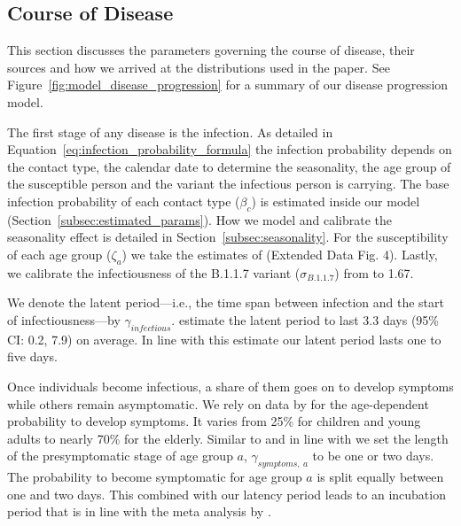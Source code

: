 \subsection{Course of Disease}
\label{sub:data_course_of_disease}

This section discusses the parameters governing the course of disease, their sources and
how we arrived at the distributions used in the paper.
See Figure~\ref{fig:model_disease_progression} for a summary of our
disease progression model.

The first stage of any disease is the infection. As detailed in
Equation~\ref{eq:infection_probability_formula} the infection
probability depends on the contact type, the calendar date to determine the seasonality,
the age group of the susceptible person and the variant the infectious person is
carrying.
%
The base infection probability of each contact type ($\beta_c$) is estimated inside our
model (Section~\ref{subsec:estimated_params}). How we model and calibrate the seasonality
effect is detailed in Section~\ref{subsec:seasonality}. For the susceptibility of each
age group ($\zeta_a$) we take the estimates of \citet{Davies2020} (Extended Data Fig. 4).
Lastly, we calibrate the infectiousness of the B.1.1.7 variant ($\sigma_{B.1.1.7}$) from
\citet{Davies2021} to 1.67.


We denote the latent period---i.e., the time span between infection and the start of
infectiousness---by $\gamma_{infectious}$. \cite{Zhao2021} estimate the latent period to
last 3.3 days (95\% CI: 0.2, 7.9) on average. In line with this estimate our latent
period lasts one to five days.

Once individuals become infectious, a share of them goes on to develop symptoms while
others remain asymptomatic. We rely on data by \cite{Davies2020} for the age-dependent
probability to develop symptoms. It varies from 25\% for children and young adults to
nearly 70\% for the elderly.
Similar to \citet{Peak2020} and in line with \citet{He2020} we set the length of the
presymptomatic stage of age group $a$, $\gamma_{symptoms,\:a}$ to be one or two days. The
probability to become symptomatic for age group $a$ is split equally between one and two
days. This combined with our latency period leads to an incubation period that is in line
with the meta analysis by \citet{McAloon2020}.

